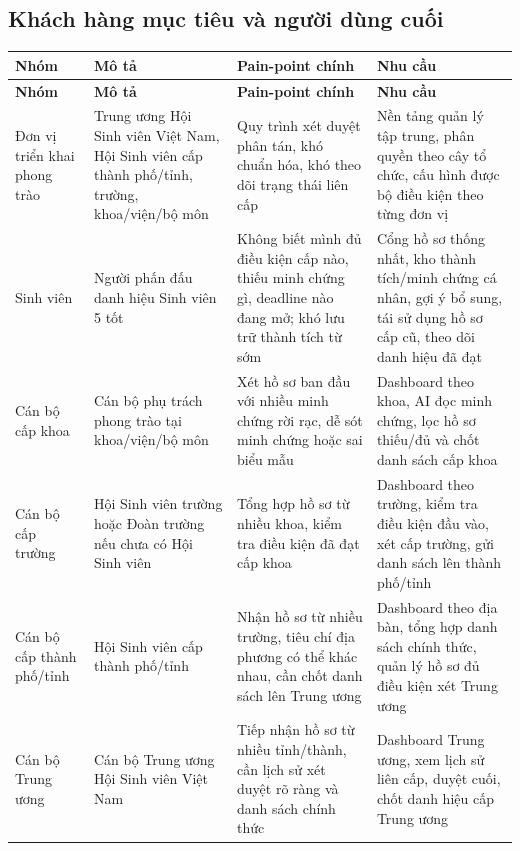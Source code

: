 \subsection{Khách hàng mục tiêu và người dùng cuối}

\begingroup
\small
\begin{longtable}{|p{}|p{}|p{}|p{}|}
\hline
\centering\arraybackslash\textbf{Nhóm} &
\centering\arraybackslash\textbf{Mô tả} &
\centering\arraybackslash\textbf{Pain-point chính} &
\centering\arraybackslash\textbf{Nhu cầu} \\ \hline
\endfirsthead

\hline
\centering\arraybackslash\textbf{Nhóm} &
\centering\arraybackslash\textbf{Mô tả} &
\centering\arraybackslash\textbf{Pain-point chính} &
\centering\arraybackslash\textbf{Nhu cầu} \\ \hline
\endhead

Đơn vị triển khai phong trào &
Trung ương Hội Sinh viên Việt Nam, Hội Sinh viên cấp thành phố/tỉnh, trường, khoa/viện/bộ môn &
Quy trình xét duyệt phân tán, khó chuẩn hóa, khó theo dõi trạng thái liên cấp &
Nền tảng quản lý tập trung, phân quyền theo cây tổ chức, cấu hình được bộ điều kiện theo từng đơn vị \\ \hline

Sinh viên &
Người phấn đấu danh hiệu Sinh viên 5 tốt &
Không biết mình đủ điều kiện cấp nào, thiếu minh chứng gì, deadline nào đang mở; khó lưu trữ thành tích từ sớm &
Cổng hồ sơ thống nhất, kho thành tích/minh chứng cá nhân, gợi ý bổ sung, tái sử dụng hồ sơ cấp cũ, theo dõi danh hiệu đã đạt \\ \hline

Cán bộ cấp khoa &
Cán bộ phụ trách phong trào tại khoa/viện/bộ môn &
Xét hồ sơ ban đầu với nhiều minh chứng rời rạc, dễ sót minh chứng hoặc sai biểu mẫu &
Dashboard theo khoa, AI đọc minh chứng, lọc hồ sơ thiếu/đủ và chốt danh sách cấp khoa \\ \hline

Cán bộ cấp trường &
Hội Sinh viên trường hoặc Đoàn trường nếu chưa có Hội Sinh viên &
Tổng hợp hồ sơ từ nhiều khoa, kiểm tra điều kiện đã đạt cấp khoa &
Dashboard theo trường, kiểm tra điều kiện đầu vào, xét cấp trường, gửi danh sách lên thành phố/tỉnh \\ \hline

Cán bộ cấp thành phố/tỉnh &
Hội Sinh viên cấp thành phố/tỉnh &
Nhận hồ sơ từ nhiều trường, tiêu chí địa phương có thể khác nhau, cần chốt danh sách lên Trung ương &
Dashboard theo địa bàn, tổng hợp danh sách chính thức, quản lý hồ sơ đủ điều kiện xét Trung ương \\ \hline

Cán bộ Trung ương &
Cán bộ Trung ương Hội Sinh viên Việt Nam &
Tiếp nhận hồ sơ từ nhiều tỉnh/thành, cần lịch sử xét duyệt rõ ràng và danh sách chính thức &
Dashboard Trung ương, xem lịch sử liên cấp, duyệt cuối, chốt danh hiệu cấp Trung ương \\ \hline

\end{longtable}
\endgroup

